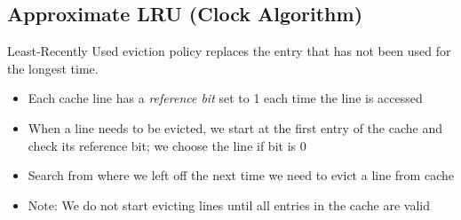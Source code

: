\subsection{Approximate LRU (Clock Algorithm)}
Least-Recently Used eviction policy replaces the entry that has not been used for the longest time.
\begin{itemize}
    \item Each cache line has a \emph{reference bit} set to 1 each time the line is accessed
    \item When a line needs to be evicted, we start at the first entry of the cache and check its reference bit; we choose the line if bit is 0
    \item Search from where we left off the next time we need to evict a line from cache
    \item Note: We do not start evicting lines until all entries in the cache are valid
\end{itemize}